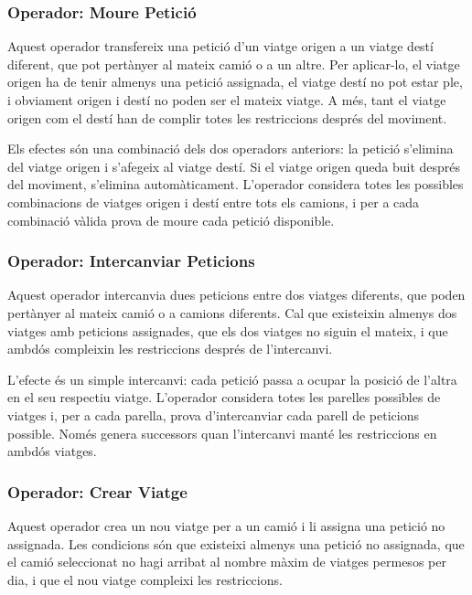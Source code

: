 \subsubsection{Operador: Moure Petició}

Aquest operador transfereix una petició d'un viatge origen a un viatge destí diferent, que pot pertànyer al mateix camió o a un altre. Per aplicar-lo, el viatge origen ha de tenir almenys una petició assignada, el viatge destí no pot estar ple, i obviament origen i destí no poden ser el mateix viatge. A més, tant el viatge origen com el destí han de complir totes les restriccions després del moviment.

Els efectes són una combinació dels dos operadors anteriors: la petició s'elimina del viatge origen i s'afegeix al viatge destí. Si el viatge origen queda buit després del moviment, s'elimina automàticament. L'operador considera totes les possibles combinacions de viatges origen i destí entre tots els camions, i per a cada combinació vàlida prova de moure cada petició disponible.

\subsubsection{Operador: Intercanviar Peticions}

Aquest operador intercanvia dues peticions entre dos viatges diferents, que poden pertànyer al mateix camió o a camions diferents. Cal que existeixin almenys dos viatges amb peticions assignades, que els dos viatges no siguin el mateix, i que ambdós compleixin les restriccions després de l'intercanvi.

L'efecte és un simple intercanvi: cada petició passa a ocupar la posició de l'altra en el seu respectiu viatge. L'operador considera totes les parelles possibles de viatges i, per a cada parella, prova d'intercanviar cada parell de peticions possible. Només genera successors quan l'intercanvi manté les restriccions en ambdós viatges.

\subsubsection{Operador: Crear Viatge}

Aquest operador crea un nou viatge per a un camió i li assigna una petició no assignada. Les condicions són que existeixi almenys una petició no assignada, que el camió seleccionat no hagi arribat al nombre màxim de viatges permesos per dia, i que el nou viatge compleixi les restriccions.


